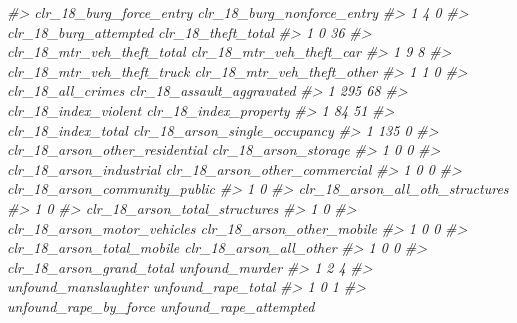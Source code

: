 \documentclass[
]{krantz}
\makeatletter
\newenvironment{Shaded}{\begin{snugshade}}{\end{snugshade}}
\newcommand{\CommentTok}[1]{\textcolor[rgb]{0.37,0.37,0.37}{\textit{#1}}}
\newenvironment{kframe}{%
\medskip{}
\setlength{\fboxsep}{.8em}
 \def\at@end@of@kframe{}%
 \ifinner\ifhmode%
  \def\at@end@of@kframe{\end{minipage}}%
  \begin{minipage}{\columnwidth}%
 \fi\fi%
 \def\FrameCommand##1{\hskip\@totalleftmargin \hskip-\fboxsep
 \colorbox{shadecolor}{##1}\hskip-\fboxsep
     \hskip-\linewidth \hskip-\@totalleftmargin \hskip\columnwidth}%
 \MakeFramed {\advance\hsize-\width
   \@totalleftmargin\z@ \linewidth\hsize
   \@setminipage}}%
 {\par\unskip\endMakeFramed%
 \at@end@of@kframe}
\renewenvironment{Shaded}{\begin{kframe}}{\end{kframe}}
\makeatother
\begin{document}
\begin{Shaded}
\begin{Highlighting}[]
\CommentTok{\#\textgreater{}   clr\_18\_burg\_force\_entry clr\_18\_burg\_nonforce\_entry}
\CommentTok{\#\textgreater{} 1                       4                          0}
\CommentTok{\#\textgreater{}   clr\_18\_burg\_attempted clr\_18\_theft\_total}
\CommentTok{\#\textgreater{} 1                     0                 36}
\CommentTok{\#\textgreater{}   clr\_18\_mtr\_veh\_theft\_total clr\_18\_mtr\_veh\_theft\_car}
\CommentTok{\#\textgreater{} 1                          9                        8}
\CommentTok{\#\textgreater{}   clr\_18\_mtr\_veh\_theft\_truck clr\_18\_mtr\_veh\_theft\_other}
\CommentTok{\#\textgreater{} 1                          1                          0}
\CommentTok{\#\textgreater{}   clr\_18\_all\_crimes clr\_18\_assault\_aggravated}
\CommentTok{\#\textgreater{} 1               295                        68}
\CommentTok{\#\textgreater{}   clr\_18\_index\_violent clr\_18\_index\_property}
\CommentTok{\#\textgreater{} 1                   84                    51}
\CommentTok{\#\textgreater{}   clr\_18\_index\_total clr\_18\_arson\_single\_occupancy}
\CommentTok{\#\textgreater{} 1                135                             0}
\CommentTok{\#\textgreater{}   clr\_18\_arson\_other\_residential clr\_18\_arson\_storage}
\CommentTok{\#\textgreater{} 1                              0                    0}
\CommentTok{\#\textgreater{}   clr\_18\_arson\_industrial clr\_18\_arson\_other\_commercial}
\CommentTok{\#\textgreater{} 1                       0                             0}
\CommentTok{\#\textgreater{}   clr\_18\_arson\_community\_public}
\CommentTok{\#\textgreater{} 1                             0}
\CommentTok{\#\textgreater{}   clr\_18\_arson\_all\_oth\_structures}
\CommentTok{\#\textgreater{} 1                               0}
\CommentTok{\#\textgreater{}   clr\_18\_arson\_total\_structures}
\CommentTok{\#\textgreater{} 1                             0}
\CommentTok{\#\textgreater{}   clr\_18\_arson\_motor\_vehicles clr\_18\_arson\_other\_mobile}
\CommentTok{\#\textgreater{} 1                           0                         0}
\CommentTok{\#\textgreater{}   clr\_18\_arson\_total\_mobile clr\_18\_arson\_all\_other}
\CommentTok{\#\textgreater{} 1                         0                      0}
\CommentTok{\#\textgreater{}   clr\_18\_arson\_grand\_total unfound\_murder}
\CommentTok{\#\textgreater{} 1                        2              4}
\CommentTok{\#\textgreater{}   unfound\_manslaughter unfound\_rape\_total}
\CommentTok{\#\textgreater{} 1                    0                  1}
\CommentTok{\#\textgreater{}   unfound\_rape\_by\_force unfound\_rape\_attempted}

\end{Highlighting}
\end{Shaded}
\end{document}
